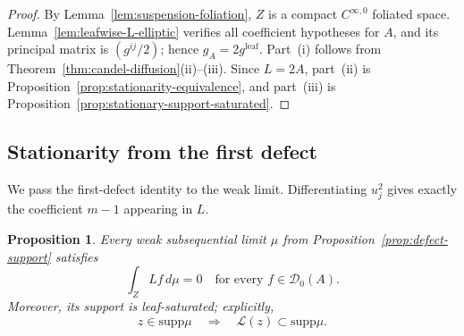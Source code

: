 \documentclass[12pt]{amsart}
\newtheorem{proposition}[theorem]{Proposition}
\theoremstyle{definition}
\numberwithin{equation}{section}
\newcommand{\mc}{\mathcal}
\newcommand{\supp}{\mathrm{supp}}
\begin{document}
\begin{proof}
By Lemma~\ref{lem:suspension-foliation}, \(Z\) is a compact
\(C^{\infty,0}\) foliated space.  Lemma~\ref{lem:leafwise-L-elliptic}
verifies all coefficient hypotheses for \(A\), and its principal matrix
is \((g^{ij}/2)\); hence \(g_A=2g^{\mathrm{leaf}}\).
Part~\textup{(i)} follows from
Theorem~\ref{thm:candel-diffusion}\textup{(ii)}--\textup{(iii)}.
Since \(L=2A\), part~\textup{(ii)} is
Proposition~\ref{prop:stationarity-equivalence}, and part~\textup{(iii)}
is Proposition~\ref{prop:stationary-support-saturated}.
\end{proof}

\subsection{Stationarity from the first defect}

We pass the first-defect identity to the weak limit.  Differentiating
\(u_j^2\) gives exactly the coefficient \(m-1\) appearing in \(L\).

\begin{proposition}
\label{prop:stationarity-defect}
Every weak subsequential limit \(\mu\) from
Proposition~\ref{prop:defect-support} satisfies
\begin{equation}\label{eq:mu-infinitesimal-stationarity}
  \int_ZLf\,d\mu=0
  \quad\text{for every }f\in\mc D_0(A).
\end{equation}
Moreover, its support is leaf-saturated; explicitly,
\[
  z\in\supp\mu\quad\Longrightarrow\quad
  \mc L(z)\subset\supp\mu.
\]
\end{proposition}
\end{document}

